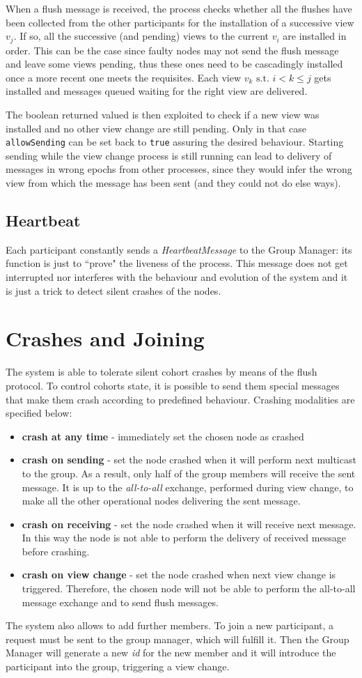 \documentclass[11pt]{article}
\begin{document}
	When a flush message is received, the process checks whether all the flushes have been collected from the other participants for the installation of a successive view $v_{j}$. If so, all the successive (and pending) views to the current $v_{i}$ are installed in order. This can be the case since faulty nodes may not send the flush message and leave some views pending, thus these ones need to be cascadingly installed once a more recent one meets the requisites.\newline
	Each view $v_{k} \text{ s.t. } i < k \le j$ gets installed and messages queued waiting for the right view are delivered.\newline
	
	The boolean returned valued is then exploited to check if a new view was installed and no other view change are still pending. Only in that case \texttt{allowSending} can be set back to \texttt{true} assuring the desired behaviour.
	Starting sending while the view change process is still running can lead to delivery of messages in wrong epochs from other processes, since they would infer the wrong view from which the message has been sent (and they could not do else ways).
		
	\subsection{Heartbeat}
	Each participant constantly sends a \textit{HeartbeatMessage} to the Group Manager: its function is just to ``prove" the liveness of the process. This message does not get interrupted nor interferes with the behaviour and evolution of the system and it is just a trick to detect silent crashes of the nodes.
	
	\section{Crashes and Joining}
	The system is able to tolerate silent cohort crashes by means of the flush protocol. To control cohorts state, it is possible to send them special messages that make them crash according to predefined behaviour. Crashing modalities are specified below:
	
	\begin{itemize}
		\item \textbf{crash at any time} - immediately set the chosen node as crashed
		\item \textbf{crash on sending} - set the node crashed when it will perform next multicast to the group. As a result, only half of the group members will receive the sent message. It is up to the \textit{all-to-all} exchange, performed during view change, to make all the other operational nodes delivering the sent message.
		\item \textbf{crash on receiving} - set the node crashed when it will receive next message. In this way the node is not able to perform the delivery of received message before crashing.
		\item \textbf{crash on view change} - set the node crashed when next view change is triggered. Therefore, the chosen node will not be able to perform the all-to-all message exchange and to send flush messages.
	\end{itemize}
	
	The system also allows to add further members. To join a new participant, a request must be sent to the group manager, which will fulfill it. Then the Group Manager will generate a new \textit{id} for the new member and it will introduce the participant into the group, triggering a view change.
		
\end{document}
